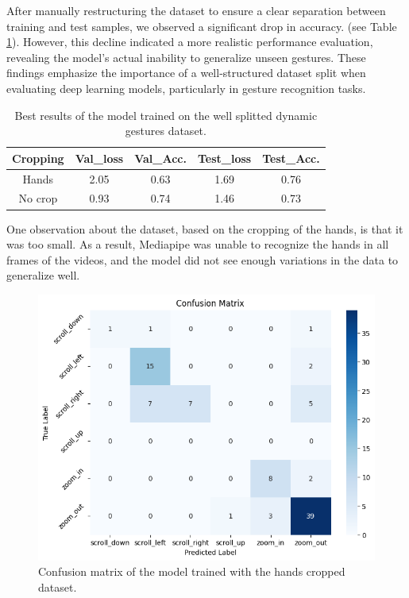\documentclass[10pt,twocolumn,letterpaper]{article}
\begin{document}
After manually restructuring the dataset to ensure a clear separation between training and test samples, we observed a significant drop in accuracy. 
(see Table \ref{tab:dynamicGesturesWell}).
However, this decline indicated a more realistic performance evaluation, 
revealing the model's actual inability to generalize unseen gestures.  
These findings emphasize the importance of a well-structured dataset split when evaluating deep 
learning models, particularly in gesture recognition tasks.
\begin{table}[h]
   \begin{center}
   \begin{tabular}{|c|c|c|c|c|}
   \hline
   \textbf{Cropping} & \textbf{Val\_loss} & \textbf{Val\_Acc.} & \textbf{Test\_loss} & \textbf{Test\_Acc.}\\
   \hline\hline
   Hands & 2.05 & 0.63 & 1.69 & 0.76 \\
   No crop & 0.93 & 0.74 & 1.46 & 0.73 \\
   \hline
   \end{tabular}
   \end{center}
   \caption{Best results of the model trained on the well splitted dynamic gestures dataset.}
   \label{tab:dynamicGesturesWell}
\end{table}
One observation about the dataset, based on the cropping of the hands, is that it was too small. 
As a result, Mediapipe was unable to recognize the hands in all frames of the videos, and the model 
did not see enough variations in the data to generalize well. \\
\begin{figure}[h]
   \centering
   \includegraphics[width=1\linewidth]{images/rightDatasetHandsCrop.png}
   \caption{Confusion matrix of the model trained with the hands cropped dataset.}
   \label{fig:handCropConfusionMatrix}
\end{figure}
\end{document}
